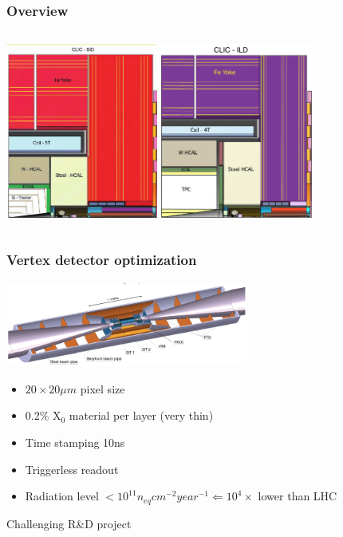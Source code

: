 \documentclass{beamer}
\begin{document}
\begin{frame}
\frametitle{Overview}
\begin{columns}[c]
\column{6cm}
\centering
\includegraphics[width=5cm]{../SIDWorkshop/CLIC_SiD_xz.pdf}
\column{6cm}
\centering
\includegraphics[width=5cm]{../SIDWorkshop/CLIC_ILD_xz.pdf}
\end{columns}
\end{frame}
\begin{frame}
\frametitle{Vertex detector optimization}
\begin{center}
\includegraphics[width=8cm]{VertexDetector.png}
\end{center}
\begin{itemize}
  \item $20\times20\mu m$ pixel size
  \item 0.2\% X$_0$ material per layer (very thin)
  \item Time stamping 10ns
  \item Triggerless readout
  \item Radiation level $<10^{11} n_{eq}cm^{-2}year^{-1}  \Leftarrow 10^4
  \times$ lower than LHC
\end{itemize}
\alert{Challenging R\&D project}
\end{frame}
\end{document}
